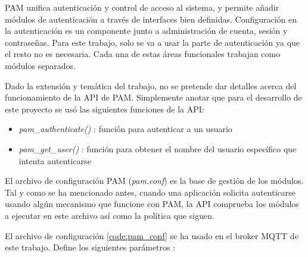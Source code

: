 PAM unifica autenticación y control de acceso al sistema, y permite añadir módulos de autenticación a través de interfaces bien 
definidas. Configuración en la autenticación es un componente junto a administración de cuenta, sesión y contraseñas. Para este 
trabajo, solo se va a usar la parte de autenticación ya que el resto no es necesaria. Cada una de estas áreas funcionales trabajan 
como módulos separados.

Dado la extensión y temática del trabajo, no se pretende dar detalles acerca del funcionamiento de la API de PAM. Simplemente 
anotar que para el desarrollo de este proyecto se usó las siguientes funciones de la API:

\begin{itemize}
    \item \textit{pam\_authenticate()} \cite{pam_sm_authenticate3}: función para autenticar a un usuario
    \item \textit{pam\_get\_user()} \cite{pam_get_user3}: función para obtener el nombre del usuario específico que intenta autenticarse
\end{itemize}

El archivo de configuración PAM (\textit{pam.conf}) es la base de gestión de los módulos. Tal y como se ha mencionado antes, 
cuando una aplicación solicita autenticarse usando algún mecanismo que funcione con PAM, la API comprueba los módulos a ejecutar
en este archivo así como la política que siguen.

El archivo de configuración \ref{code:pam_conf} se ha usado en el broker MQTT de este trabajo. Define los siguientes parámetros 
\cite{mosquittoconf_2021}:


